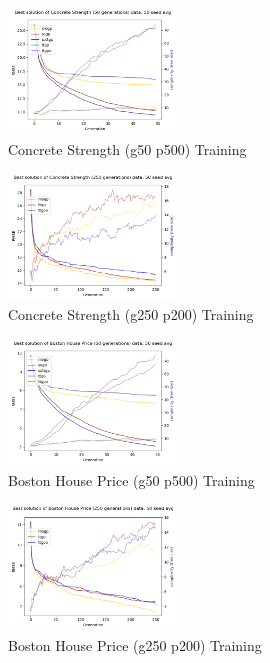 \documentclass[a4paper, twocolumn]{article}
\begin{document}
\begin{figure}[t]
	\caption{Concrete Strength (g50 p500) Training}
	\includegraphics[width=0.40\textwidth]{Concrete Strength (50 generations)-besttrain-evo}
\end{figure}
\begin{figure}[t]
	\caption{Concrete Strength (g250 p200) Training}
	\includegraphics[width=0.40\textwidth]{Concrete Strength (250 generations)-besttrain-evo}
\end{figure}
\begin{figure}[t]
	\caption{Boston House Price (g50 p500) Training}
	\includegraphics[width=0.40\textwidth]{Boston House Price (50 generations)-besttrain-evo}
\end{figure}
\begin{figure}[t]
	\caption{Boston House Price (g250 p200) Training}
	\includegraphics[width=0.40\textwidth]{Boston House Price (250 generations)-besttrain-evo}
\end{figure}
\end{document}
